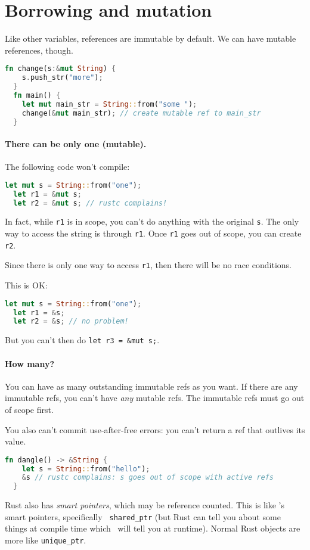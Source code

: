 \section*{Borrowing and mutation} Like other variables, references are immutable by default.
We can have mutable references, though.
\begin{lstlisting}[language=Rust]
  fn change(s:&mut String) {
    s.push_str("more");
  }
  fn main() {
    let mut main_str = String::from("some ");
    change(&mut main_str); // create mutable ref to main_str
  }
\end{lstlisting}

\paragraph{There can be only one (mutable).} The following code won't compile:
\begin{lstlisting}[language=Rust]
  let mut s = String::from("one");
  let r1 = &mut s;
  let r2 = &mut s; // rustc complains!
\end{lstlisting}
In fact, while {\tt r1} is in scope, you can't do anything with the original {\tt s}.
The only way to access the string is through {\tt r1}. Once {\tt r1} goes out of scope,
you can create {\tt r2}.

Since there is only one way to access {\tt r1}, then there will be no race conditions.

This is OK:
\begin{lstlisting}[language=Rust]
  let mut s = String::from("one");
  let r1 = &s;
  let r2 = &s; // no problem!
\end{lstlisting}
But you can't then do {\tt let r3 = \&mut s;}.

\paragraph{How many?} You can have as many outstanding immutable refs as you want.
If there are any immutable refs, you can't have \emph{any} mutable refs. The immutable
refs must go out of scope first.

You also can't commit use-after-free errors: you can't return a ref that outlives
its value.
\begin{lstlisting}[language=Rust]
  fn dangle() -> &String {
    let s = String::from("hello");
    &s // rustc complains: s goes out of scope with active refs
  }
\end{lstlisting}

Rust also has \emph{smart pointers}, which may be reference
counted. This is like \CPP's smart pointers, specifically {\tt
  shared\_ptr} (but Rust can tell you about some things at compile
time which \CPP~will tell you at runtime). Normal Rust objects are more
like {\tt unique\_ptr}.

